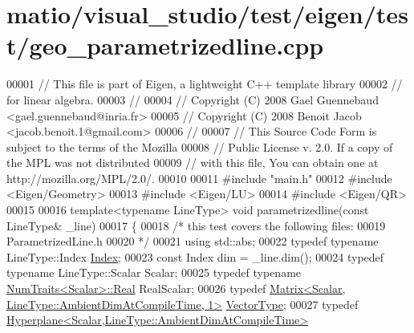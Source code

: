 \hypertarget{matio_2visual__studio_2test_2eigen_2test_2geo__parametrizedline_8cpp_source}{}\section{matio/visual\+\_\+studio/test/eigen/test/geo\+\_\+parametrizedline.cpp}
\label{matio_2visual__studio_2test_2eigen_2test_2geo__parametrizedline_8cpp_source}

\begin{DoxyCode}
00001 \textcolor{comment}{// This file is part of Eigen, a lightweight C++ template library}
00002 \textcolor{comment}{// for linear algebra.}
00003 \textcolor{comment}{//}
00004 \textcolor{comment}{// Copyright (C) 2008 Gael Guennebaud <gael.guennebaud@inria.fr>}
00005 \textcolor{comment}{// Copyright (C) 2008 Benoit Jacob <jacob.benoit.1@gmail.com>}
00006 \textcolor{comment}{//}
00007 \textcolor{comment}{// This Source Code Form is subject to the terms of the Mozilla}
00008 \textcolor{comment}{// Public License v. 2.0. If a copy of the MPL was not distributed}
00009 \textcolor{comment}{// with this file, You can obtain one at http://mozilla.org/MPL/2.0/.}
00010 
00011 \textcolor{preprocessor}{#include "main.h"}
00012 \textcolor{preprocessor}{#include <Eigen/Geometry>}
00013 \textcolor{preprocessor}{#include <Eigen/LU>}
00014 \textcolor{preprocessor}{#include <Eigen/QR>}
00015 
00016 \textcolor{keyword}{template}<\textcolor{keyword}{typename} LineType> \textcolor{keywordtype}{void} parametrizedline(\textcolor{keyword}{const} LineType& \_line)
00017 \{
00018   \textcolor{comment}{/* this test covers the following files:}
00019 \textcolor{comment}{     ParametrizedLine.h}
00020 \textcolor{comment}{  */}
00021   \textcolor{keyword}{using} std::abs;
00022   \textcolor{keyword}{typedef} \textcolor{keyword}{typename} LineType::Index \hyperlink{namespace_eigen_a62e77e0933482dafde8fe197d9a2cfde}{Index};
00023   \textcolor{keyword}{const} Index dim = \_line.dim();
00024   \textcolor{keyword}{typedef} \textcolor{keyword}{typename} LineType::Scalar Scalar;
00025   \textcolor{keyword}{typedef} \textcolor{keyword}{typename} \hyperlink{group___core___module_struct_eigen_1_1_num_traits}{NumTraits<Scalar>::Real} RealScalar;
00026   \textcolor{keyword}{typedef} \hyperlink{group___core___module_class_eigen_1_1_matrix}{Matrix<Scalar, LineType::AmbientDimAtCompileTime, 1>}
       \hyperlink{struct_vector_type}{VectorType};
00027   \textcolor{keyword}{typedef} \hyperlink{group___geometry___module_class_eigen_1_1_hyperplane}{Hyperplane<Scalar,LineType::AmbientDimAtCompileTime>}

\end{DoxyCode}
